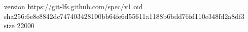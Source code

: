 version https://git-lfs.github.com/spec/v1
oid sha256:6e8e8842dc747403428100bb64fe6d55611a1188b6bdd76fd110e348fd2a8df3
size 22000
